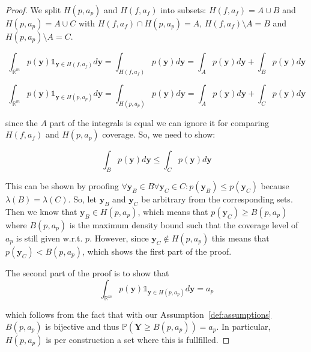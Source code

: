 \begin{proof}
    We split $H(p,a_p)$ and $H(f, a_f)$ into subsets: $H(f, a_f) = A \cup B$ and $H(p, a_p) = A \cup C$ with $H(f, a_f) \cap H(p,a_p) = A$, $H(f, a_f)\setminus A = B$ and $H(p, a_p)\setminus A = C$.

    \begin{equation}
        \int_{\mathbb{R}^{m}} p(\mathbf{y}) \mathds1_{\mathbf{y} \in H(f, a_f)} d
        \mathbf{y} = \int_{H(f, a_f)} p(\mathbf{y}) d \mathbf{y} = \int_{A}
        p(\mathbf{y})
        d \mathbf{y} + \int_{B} p(\mathbf{y}) d \mathbf{y}
    \end{equation}

    \begin{equation}
        \int_{\mathbb{R}^{m}} p(\mathbf{y}) \mathds1_{\mathbf{y} \in H(p, a_p)} d
        \mathbf{y} = \int_{H(p, a_p)} p(\mathbf{y}) d \mathbf{y} = \int_{A}
        p(\mathbf{y})
        d \mathbf{y} + \int_{C} p(\mathbf{y}) d \mathbf{y}
    \end{equation}

    since the $A$ part of the integrals is equal we can ignore it for comparing $H(f, a_f)$ and $H(p, a_p)$ coverage. So, we need to show:

    \begin{equation}
        \int_{B} p(\mathbf{y}) d \mathbf{y} \leq \int_{C} p(\mathbf{y}) d
        \mathbf{y}
    \end{equation}

    This can be shown by proofing $\forall \mathbf{y}_B\in B \forall \mathbf{y}_C \in C: p(\mathbf{y}_B) \leq p(\mathbf{y}_C)$ because $\lambda(B) =  \lambda(C)$.
    So, let $\mathbf{y}_B$ and $\mathbf{y}_C$ be arbitrary from the corresponding sets. Then we know that $\mathbf{y}_B \in H(p,a_p)$, which means that $p(\mathbf{y}_C) \geq B(p, a_p)$ where $B(p, a_p)$ is the maximum density bound such that the coverage level of $a_p$ is still given w.r.t. $p$. However, since $\mathbf{y}_C \notin H(p,a_p)$ this means that $p(\mathbf{y}_C) < B(p, a_p)$, which shows the first part of the proof.

    The second part of the proof is to show that
    \begin{equation}
        \int_{\mathbb{R}^{m}} p(\mathbf{y}) \mathds1_{\mathbf{y} \in H(p, a_p)} d
        \mathbf{y} = a_p
    \end{equation}

    which follows from the fact that with our Assumption~\ref{def:assumptions} $B(p, a_p)$ is bijective and thus $\mathbb{P}(\mathbf{Y} \geq B(p, a_p)) = a_p$. In particular, $H(p, a_p)$ is per construction a set where this is fullfilled.
\end{proof}

